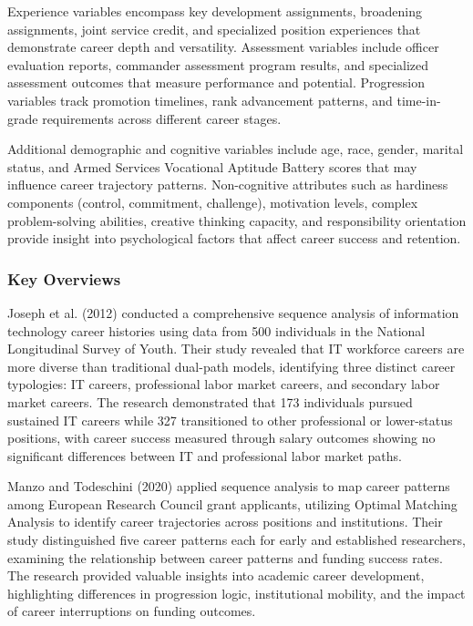 \documentclass[main.tex]{subfiles}
\begin{document}
Experience variables encompass key development assignments, broadening assignments, joint service credit, and specialized position experiences that demonstrate career depth and versatility. Assessment variables include officer evaluation reports, commander assessment program results, and specialized assessment outcomes that measure performance and potential. Progression variables track promotion timelines, rank advancement patterns, and time-in-grade requirements across different career stages\parencite{potential2024}.

Additional demographic and cognitive variables include age, race, gender, marital status, and Armed Services Vocational Aptitude Battery scores that may influence career trajectory patterns. Non-cognitive attributes such as hardiness components (control, commitment, challenge), motivation levels, complex problem-solving abilities, creative thinking capacity, and responsibility orientation provide insight into psychological factors that affect career success and retention\parencite{potential2024}.

\subsubsection{Key Overviews}

Joseph et al. (2012) conducted a comprehensive sequence analysis of information technology career histories using data from 500 individuals in the National Longitudinal Survey of Youth. Their study revealed that IT workforce careers are more diverse than traditional dual-path models, identifying three distinct career typologies: IT careers, professional labor market careers, and secondary labor market careers. The research demonstrated that 173 individuals pursued sustained IT careers while 327 transitioned to other professional or lower-status positions, with career success measured through salary outcomes showing no significant differences between IT and professional labor market paths\parencite{joseph2012}.

Manzo and Todeschini (2020) applied sequence analysis to map career patterns among European Research Council grant applicants, utilizing Optimal Matching Analysis to identify career trajectories across positions and institutions. Their study distinguished five career patterns each for early and established researchers, examining the relationship between career patterns and funding success rates. The research provided valuable insights into academic career development, highlighting differences in progression logic, institutional mobility, and the impact of career interruptions on funding outcomes\parencite{manzo2020}.
\end{document}
